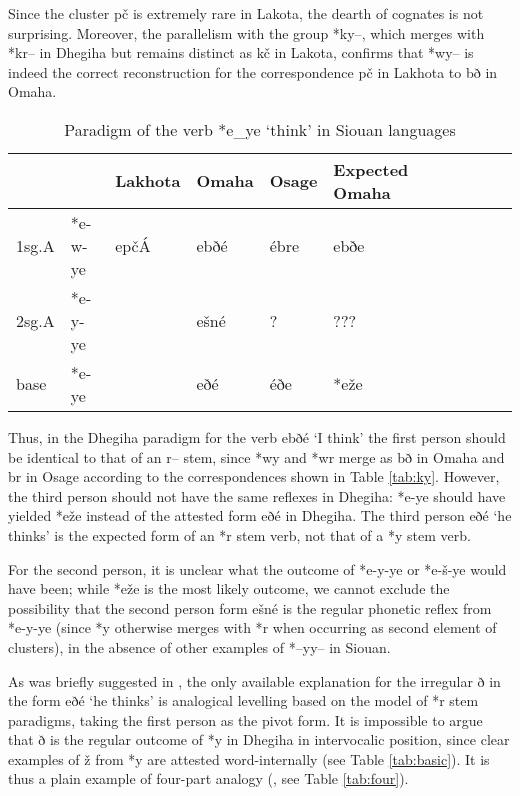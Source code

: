 \documentclass[oneside,a4paper,11pt]{article}
\newcommand{\ipa}[1]{{\phon#1}} %
\newcommand{\grise}[1]{\cellcolor{lightgray}\textbf{#1}}
\begin{document}
  
 
 Since the cluster \ipa{pč} is extremely rare in Lakota, the dearth of cognates is not surprising. Moreover, the parallelism with the group *\ipa{ky--}, which merges with *\ipa{kr--} in Dhegiha but remains distinct as \ipa{kč} in Lakota, confirms that *\ipa{wy--} is indeed the correct reconstruction for the correspondence \ipa{pč} in Lakhota to \ipa{bð} in Omaha.
 
 \begin{table}[h]
\caption{Paradigm of the verb *\ipa{e\_ye} `think' in Siouan languages}  \label{tab:think} \centering
\begin{tabular}{ll|l|ll|llll|ll}
\toprule
 &	 &	Lakhota &	 	Omaha &	Osage 	& Expected Omaha\\	
 \midrule
1sg.A &	*\ipa{e-w-ye} &	 \ipa{epčÁ} &   \ipa{ebðé} &\ipa{ébre} &\ipa{ebðe}\\
2sg.A &*\ipa{e-y-ye}&  &  \ipa{ešné} &? &???& \\
base &	*\ipa{e-ye} &	  &\ipa{eðé} &\ipa{éðe} & *\ipa{eže}\grise{}\\
\bottomrule			
\end{tabular}
\end{table} 

 Thus, in the Dhegiha paradigm for the verb \ipa{ebðé} `I think'     the first person should  be identical to that of an \ipa{r--} stem, since *\ipa{wy} and *\ipa{wr} merge as \ipa{bð} in Omaha and \ipa{br} in Osage according to the correspondences shown in Table \ref{tab:ky}. However,  the third person should not have the same reflexes in Dhegiha:  *\ipa{e-ye} should have yielded *\ipa{eže} instead of the attested form \ipa{eðé} in Dhegiha. The third person \ipa{eðé}  `he thinks' is the expected  form of an *\ipa{r} stem verb, not that of a *\ipa{y} stem verb.
 
 
 For the second person, it is unclear what the outcome of *\ipa{e-y-ye} or *\ipa{e-š-ye} would have been; while  *\ipa{eže}  is the most likely outcome, we cannot exclude the possibility that the second person form  \ipa{ešné} is the regular phonetic reflex from  *\ipa{e-y-ye} (since *\ipa{y} otherwise merges with *\ipa{r} when occurring as second element of clusters), in the absence of other examples of *\ipa{--yy--} in Siouan.

As was briefly suggested in \citet{rankin15csd}, the only available explanation for the irregular \ipa{ð} in the form \ipa{eðé} `he thinks' is analogical levelling based on the model of *\ipa{r} stem paradigms, taking the first person as the pivot form. It is impossible to argue that \ipa{ð} is the regular outcome of *\ipa{y} in Dhegiha in intervocalic position, since clear examples of \ipa{ž} from *\ipa{y} are attested word-internally (see Table \ref{tab:basic}). It is thus a plain example of four-part analogy (\citealt[167-175]{hock91principles}, see Table \ref{tab:four}).
\end{document}
